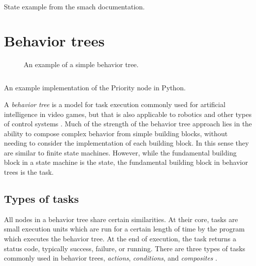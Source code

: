 \documentclass[\rootfolder/main.tex]{subfiles}
\begin{document}
\begin{listing}
\inputminted{python}{\rootfolder/Chapters/Chapter2/Listings/smachstate.py}
\caption{State example from the \acrshort{smach} documentation.}
\end{listing}


\section{Behavior trees}

\begin{wrapfigure}{L}{0.5\columnwidth}
    \caption{An example of a simple behavior tree.}
    \label{fig:bt}
\end{wrapfigure}

\begin{listing}
    \inputminted{python}{\rootfolder/Chapters/Chapter2/Listings/priority.py}
    \caption{An example implementation of the Priority node in Python.\label{lst:priority}}
\end{listing}

A \emph{behavior tree} is a model for task execution commonly used for artificial intelligence in video games, but that is also applicable to robotics and other types of control systems \cite{Millington2009}.
Much of the strength of the behavior tree approach lies in the ability to compose complex behavior from simple building blocks, without needing to consider the implementation of each building block.
In this sense they are similar to finite state machines.
However, while the fundamental building block in a state machine is the state, the fundamental building block in behavior trees is the task.


\subsection{Types of tasks}

All nodes in a behavior tree share certain similarities.
At their core, tasks are small execution units which are run for a certain length of time by the program which executes the behavior tree.
At the end of execution, the task returns a status code, typically success, failure, or running.
There are three types of tasks commonly used in behavior trees, \emph{actions}, \emph{conditions}, and \emph{composites} \cite{Millington2009}.
\end{document}
